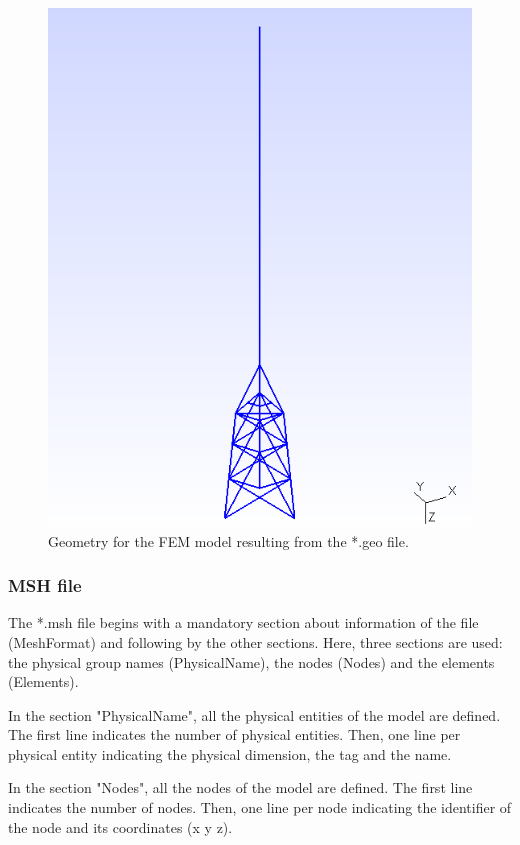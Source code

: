 \documentclass[a4]{article}
\begin{document}
\begin{figure}[tbh!]
	\centering
	\includegraphics[scale=0.6]{geo1.png}
	\caption{Geometry for the FEM model resulting from the *.geo file.}
	\label{fig:geo1}
\end{figure}

\subsubsection{MSH file}

The *.msh file begins with a mandatory section about information of the file (MeshFormat) and following by the other sections. Here, three sections are used: the physical group names (PhysicalName), the nodes (Nodes) and the elements (Elements).

In the section "PhysicalName", all the physical entities of the model are defined. The first line indicates the number of physical entities. Then, one line per physical entity indicating the physical dimension, the tag and the name.  

In the section "Nodes", all the nodes of the model are defined. The first line indicates the number of nodes. Then, one line per node indicating the identifier of the node and its coordinates (x y z).
\end{document}
